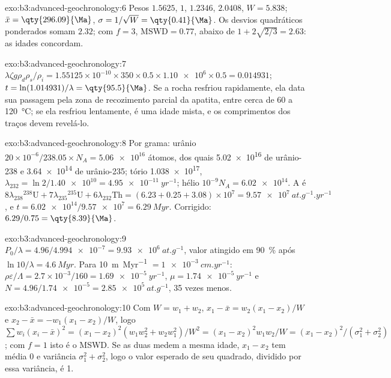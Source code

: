 \begin{solution}{exo:b3:advanced-geochronology:6}
Pesos $1.5625$, $1$, $1.2346$, $2.0408$, $W = 5.838$; $\bar x =
\qty{296.09}{\Ma}$, $\sigma = 1/\sqrt W = \qty{0.41}{\Ma}$. Os desvios quadráticos ponderados
somam $2.32$; com $f = 3$, $\mathrm{MSWD} = 0.77$, abaixo de
$1 + 2\sqrt{2/3} = 2.63$: as idades concordam.
\end{solution}

\begin{solution}{exo:b3:advanced-geochronology:7}
$\lambda\zeta g\rho_d\rho_s/\rho_i = 1.55125\times10^{-10}\times350\times0.5
\times\num{1.10e6}\times0.5 = 0.014931$; $t = \ln(1.014931)/\lambda =
\qty{95.5}{\Ma}$. Se a rocha resfriou rapidamente, ela data sua passagem pela
zona de recozimento parcial da apatita, entre cerca de 60 a \qty{120}{\celsius}; se ela
resfriou lentamente, é uma idade mista, e os comprimentos dos traços devem revelá-lo.
\end{solution}

\begin{solution}{exo:b3:advanced-geochronology:8}
Por grama: urânio $20\times10^{-6}/238.05\times N_A = \num{5.06e16}$ átomos, dos
quais \num{5.02e16} de urânio-238 e \num{3.64e14} de urânio-235; tório
\num{1.038e17}, $\lambda_{232} = \ln 2/\num{1.40e10} = \qty{4.95e-11}{yr^{-1}}$;
hélio $10^{-9}N_A = \num{6.02e14}$. A  é
$8\lambda_{238}{}^{238}\mathrm U + 7\lambda_{235}{}^{235}\mathrm U +
6\lambda_{232}\mathrm{Th} = (6.23 + 0.25 + 3.08)\times10^7 =
\qty{9.57e7}{at.g^{-1}.yr^{-1}}$, e $t = \num{6.02e14}/\num{9.57e7} =
\qty{6.29}{Myr}$. Corrigido: $6.29/0.75 = \qty{8.39}{\Ma}$.
\end{solution}

\begin{solution}{exo:b3:advanced-geochronology:9}
$P_0/\lambda = 4.96/\num{4.994e-7} = \qty{9.93e6}{at.g^{-1}}$, valor atingido em
\qty{90}{\percent} após $\ln 10/\lambda = \qty{4.6}{Myr}$. Para
\qty{10}{m.Myr^{-1}} $= \qty{1e-3}{cm.yr^{-1}}$: $\rho\varepsilon/\Lambda =
2.7\times10^{-3}/160 = \qty{1.69e-5}{yr^{-1}}$, $\mu = \qty{1.74e-5}{yr^{-1}}$
e $N = 4.96/\num{1.74e-5} = \qty{2.85e5}{at.g^{-1}}$, 35 vezes menos.
\end{solution}

\begin{solution}{exo:b3:advanced-geochronology:10}
Com $W = w_1 + w_2$, $x_1 - \bar x = w_2(x_1 - x_2)/W$ e $x_2 - \bar x =
-w_1(x_1 - x_2)/W$, logo $\sum w_i(x_i - \bar x)^2 = (x_1 - x_2)^2(w_1w_2^2 +
w_2w_1^2)/W^2 = (x_1 - x_2)^2w_1w_2/W = (x_1 - x_2)^2/(\sigma_1^2 +
\sigma_2^2)$; com $f = 1$ isto é o MSWD. Se as duas medem a mesma idade,
$x_1 - x_2$ tem média 0 e variância $\sigma_1^2 + \sigma_2^2$, logo o
valor esperado de seu quadrado, dividido por essa variância, é 1.
\end{solution}

